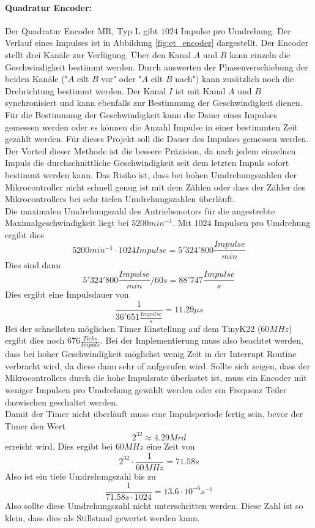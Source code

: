 \documentclass[../../main.tex]{subfiles}
\begin{document}
    \paragraph{Quadratur Encoder:} Der Quadratur Encoder MR, Typ L gibt $1024$ Impulse pro Umdrehung. Der Verlauf eines Impulses ist in Abbildung \ref{fig:et_encoder} dargestellt. Der Encoder stellt drei Kanäle zur Verfügung. Über den Kanal $A$ und $B$ kann einzeln die Geschwindigkeit bestimmt werden. Durch auswerten der Phasenverschiebung der beiden Kanäle ("$A$ eilt $B$ vor" oder "$A$ eilt $B$ nach") kann zusätzlich noch die Drehrichtung bestimmt werden. Der Kanal $I$ ist mit Kanal $A$ und $B$ synchronisiert und kann ebenfalls zur Bestimmung der Geschwindigkeit dienen.\\
    Für die Bestimmung der Geschwindigkeit kann die Dauer eines Impulses gemessen werden oder es können die Anzahl Impulse in einer bestimmten Zeit gezählt werden. Für dieses Projekt soll die Dauer des Impulses gemessen werden. Der Vorteil dieser Methode ist die bessere Präzision, da nach jedem einzelnen Impuls die durchschnittliche Geschwindigkeit seit dem letzten Impuls sofort bestimmt werden kann. Das Risiko ist, dass bei hohen Umdrehungszahlen der Mikrocontroller nicht schnell genug ist mit dem Zählen oder dass der Zähler des Mikrocontrollers bei sehr tiefen Umdrehungszahlen überläuft.\\
    Die maximalen Umdrehungszahl des Antriebsmotors für die angestrebte Maximalgeschwindigkeit liegt bei $5200 min^{-1}$. Mit $1024$ Impulsen pro Umdrehung ergibt dies $$5200 min^{-1} \cdot 1024 Impulse = 5'324'800 \frac{Impulse}{min}$$
    Dies sind dann $$ 5'324'800 \frac{Impulse}{min} / 60s = 88'747 \frac{Impulse}{s} $$
    Dies ergibt eine Impulsdauer von $$\frac{1}{36'651 \frac{Impulse}{s}} = 11.29\mu s$$ Bei der schnellsten möglichen
    Timer Einstellung auf dem TinyK22 ($60MHz$) ergibt dies noch $676 \frac{Ticks}{Impuls}$. Bei der Implementierung
    muss also beachtet werden, dass bei hoher Geschwindigkeit möglichst wenig Zeit in der Interrupt Routine verbracht
    wird, da diese dann sehr of aufgerufen wird. Sollte sich zeigen, dass der Mikrocontrollers durch die hohe Impulsrate
    überlastet ist, muss ein Encoder mit weniger Impulsen pro Umdrehung gewählt werden oder ein Frequenz Teiler
    dazwischen geschaltet werden.\\
    Damit der Timer nicht überläuft muss eine Impulsperiode fertig sein, bevor der Timer den Wert $$2^{32} \approx 4.29 Mrd$$ erreicht wird. Dies ergibt bei $60MHz$ eine Zeit von $$2^{32} \cdot \frac{1}{60MHz} = 71.58s$$ Also ist ein tiefe Umdrehungszahl bis zu $$\frac{1}{71.58s \cdot 1024} = 13.6 \cdot 10^{-6} s^{-1}$$
    Also sollte diese Umdrehungszahl nicht unterschritten werden. Diese Zahl ist so klein, dass dies als Stillstand gewertet werden kann.
\end{document}
